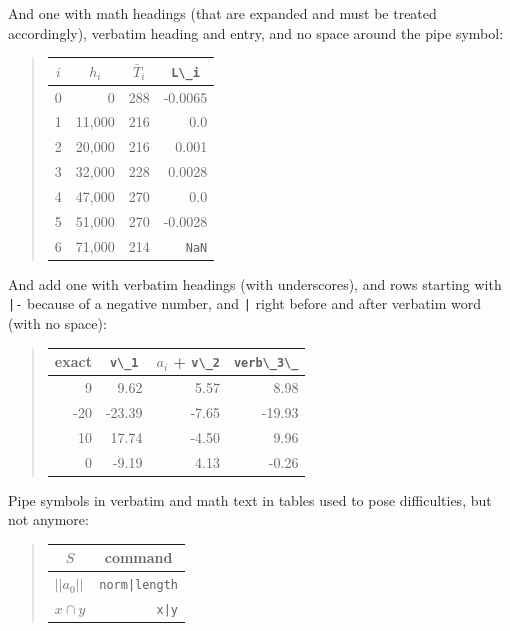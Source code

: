 \documentclass[%
oneside,                 %
final,                   %
10pt]{article}
\theoremstyle{definition}
\begin{document}
\begin{enumerate}
\noindent
And one with math headings (that are expanded and must be treated
accordingly), verbatim heading and entry, and no space around the pipe
symbol:


\begin{quote}
\begin{tabular}{lrrr}
\hline
\multicolumn{1}{c}{ $i$ } & \multicolumn{1}{c}{ $h_i$ } & \multicolumn{1}{c}{ $\bar T_i$ } & \multicolumn{1}{c}{ \Verb!L\_i! } \\
\hline
0   & 0      & 288        & -0.0065    \\
1   & 11,000 & 216        & 0.0        \\
2   & 20,000 & 216        & 0.001      \\
3   & 32,000 & 228        & 0.0028     \\
4   & 47,000 & 270        & 0.0        \\
5   & 51,000 & 270        & -0.0028    \\
6   & 71,000 & 214        & \texttt{NaN} \\
\hline
\end{tabular}
\end{quote}

\noindent
And add one with verbatim headings (with underscores),
and rows starting with \texttt{|-} because of a negative number,
and \texttt{|} right before and after verbatim word (with no space):


\begin{quote}
\begin{tabular}{rrrr}
\hline
\multicolumn{1}{c}{ exact } & \multicolumn{1}{c}{ \Verb!v\_1! } & \multicolumn{1}{c}{ $a_i$ + \Verb!v\_2! } & \multicolumn{1}{c}{ \Verb!verb\_3\_! } \\
\hline
9     & 9.62       & 5.57               & 8.98           \\
-20   & -23.39     & -7.65              & -19.93         \\
10    & 17.74      & -4.50              & 9.96           \\
0     & -9.19      & 4.13               & -0.26          \\
\hline
\end{tabular}
\end{quote}

\noindent
Pipe symbols in verbatim and math text in tables used to pose difficulties,
but not
anymore:


\begin{quote}
\begin{tabular}{lr}
\hline
\multicolumn{1}{c}{ $S$ } & \multicolumn{1}{c}{ command } \\
\hline
$ ||a_0|| $ & \texttt{norm|length} \\
$x\cap y$   & \texttt{x|y}         \\
\hline
\end{tabular}
\end{quote}


\end{enumerate}
\end{document}

